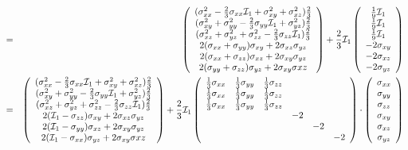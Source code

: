 \begin{eqnarray}
&=&
\left(
\begin{array}{c}
(\sigma_{xx}^2 -\frac23 \sigma_{xx} {\cal I}_1  +  \sigma_{xy}^2 +  \sigma_{xz}^2 ) \frac23 \\
(\sigma_{xy}^2 +  \sigma_{yy}^2 -\frac23 \sigma_{yy} {\cal I}_1  +  \sigma_{yz}^2 ) \frac23 \\
(\sigma_{xz}^2 +  \sigma_{yz}^2 + \sigma_{zz}^2 -\frac23 \sigma_{zz} {\cal I}_1  ) \frac23 \\
2(\sigma_{xx}+\sigma_{yy})\sigma_{xy} + 2 \sigma_{xz}\sigma_{yz} \\
2(\sigma_{xx}+\sigma_{zz})\sigma_{xz} + 2 \sigma_{xy}\sigma_{yz} \\
2(\sigma_{yy}+\sigma_{zz})\sigma_{yz} + 2 \sigma_{xy}\sigma{xz} 
\end{array}
\right) 
+
\frac{2}{3}{\cal I}_1
\left(
\begin{array}{c}
\frac19{\cal I}_1 \\
\frac19{\cal I}_1 \\
\frac19{\cal I}_1 \\
-2\sigma_{xy} \\
-2\sigma_{xz} \\
-2\sigma_{yz} \\
\end{array}
\right) \\
&=&
\left(
\begin{array}{c}
(\sigma_{xx}^2 -\frac23 \sigma_{xx} {\cal I}_1  +  \sigma_{xy}^2 +  \sigma_{xz}^2 ) \frac23 \\
(\sigma_{xy}^2 +  \sigma_{yy}^2 -\frac23 \sigma_{yy} {\cal I}_1  +  \sigma_{yz}^2 ) \frac23 \\
(\sigma_{xz}^2 +  \sigma_{yz}^2 + \sigma_{zz}^2 -\frac23 \sigma_{zz} {\cal I}_1  ) \frac23 \\
2({\cal I}_1-\sigma_{zz})\sigma_{xy} + 2 \sigma_{xz}\sigma_{yz} \\
2({\cal I}_1-\sigma_{yy})\sigma_{xz} + 2 \sigma_{xy}\sigma_{yz} \\
2({\cal I}_1-\sigma_{xx})\sigma_{yz} + 2 \sigma_{xy}\sigma{xz} 
\end{array}
\right) 
+
\frac{2}{3}{\cal I}_1
\left(
\begin{array}{cccccc}
\frac13 \sigma_{xx} & \frac13 \sigma_{yy} & \frac13 \sigma_{zz} && \\
\frac13 \sigma_{xx} & \frac13 \sigma_{yy} & \frac13 \sigma_{zz} && \\
\frac13 \sigma_{xx} & \frac13 \sigma_{yy} & \frac13 \sigma_{zz} && \\
 &&&-2 \\
&&&&-2 \\
&&&&&-2 \\
\end{array}
\right)
\cdot
\left(
\begin{array}{c}
\sigma_{xx}\\
\sigma_{yy}\\
\sigma_{zz}\\
\sigma_{xy}\\
\sigma_{xz}\\
\sigma_{yz}
\end{array}
\right)
\end{eqnarray}




